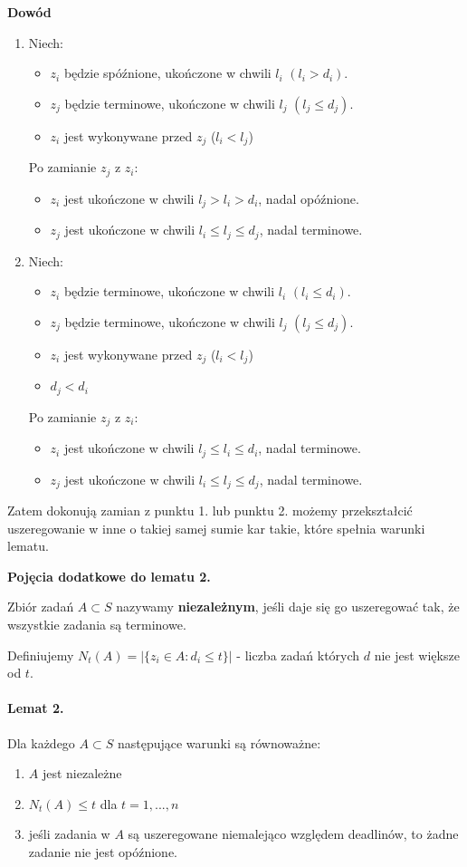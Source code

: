 \textbf{Dowód}
\begin{enumerate}
	\item{Niech: 
	\begin{itemize}
		\item $z_i$ będzie spóźnione, ukończone w chwili $l_i$ $(l_i > d_i)$.
		\item $z_j$ będzie terminowe, ukończone w chwili $l_j$ $(l_j \leq d_j)$.
		\item $z_i$ jest wykonywane przed $z_j$ ($l_i < l_j$)
	\end{itemize}
	Po zamianie $z_j$ z $z_i$:
	\begin{itemize}
		\item $z_i$ jest ukończone w chwili $l_j > l_i > d_i$, nadal opóźnione.
		\item $z_j$ jest ukończone w chwili $l_i \leq l_j \leq d_j$, nadal terminowe.
	\end{itemize}
	}
	
	\item{Niech:
	\begin{itemize}
		\item $z_i$ będzie terminowe, ukończone w chwili $l_i$ $(l_i \leq d_i)$.
		\item $z_j$ będzie terminowe, ukończone w chwili $l_j$ $(l_j \leq d_j)$.
		\item $z_i$ jest wykonywane przed $z_j$ ($l_i < l_j$)
		\item $d_j < d_i$
	\end{itemize}
	Po zamianie $z_j$ z $z_i$:
	\begin{itemize}
		\item $z_i$ jest ukończone w chwili $l_j \leq l_i \leq d_i$, nadal terminowe.
		\item $z_j$ jest ukończone w chwili $l_i \leq l_j \leq d_j$, nadal terminowe.
	\end{itemize}
	}
\end{enumerate}
Zatem dokonują zamian z punktu 1. lub punktu 2. możemy przekształcić uszeregowanie w inne o takiej samej sumie kar takie, które spełnia warunki lematu.

\textbf{Pojęcia dodatkowe do lematu 2.}

Zbiór zadań $A \subset S$ nazywamy \textbf{niezależnym}, jeśli daje się go uszeregować tak, że wszystkie zadania są terminowe. 

Definiujemy $N_t(A) = |\{z_i \in A : d_i \leq t \}|$ - liczba zadań których $d$ nie jest większe od $t$. 

\paragraph{Lemat 2.} 
Dla każdego $A \subset S$ następujące warunki są równoważne:
\begin{enumerate}
	\item $A$ jest niezależne
	\item $N_t(A) \leq t$ dla $t = 1,...,n$
	\item jeśli zadania w $A$ są uszeregowane niemalejąco względem deadlinów, to żadne zadanie nie jest opóźnione.
\end{enumerate}  

